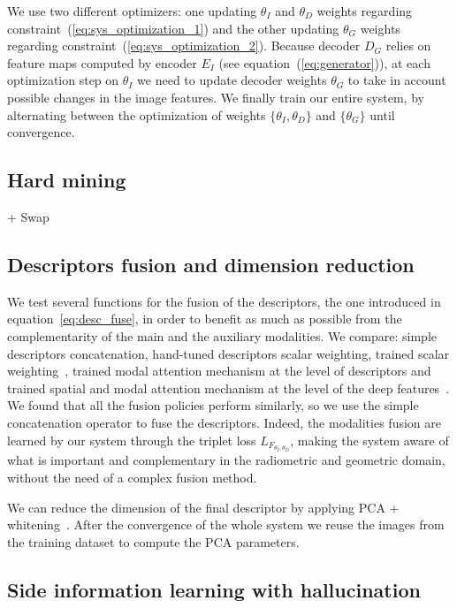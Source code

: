 We use two different optimizers: one updating $\theta_{I}$ and $\theta_{D}$ weights regarding constraint~(\ref{eq:sys_optimization_1}) and the other updating $\theta_{G}$ weights regarding constraint~(\ref{eq:sys_optimization_2}). Because decoder $D_G$ relies on feature maps computed by encoder $E_I$ (see equation~(\ref{eq:generator})), at each optimization step on $\theta_{I}$ we need to update decoder weights $\theta_{G}$ to take in account possible changes in the image features. We finally train our entire system, by alternating between the optimization of weights $\{\theta_{I}, \theta_{D}\}$ and $\{\theta_G\}$ until convergence.

\subsection{Hard mining}

+ Swap

\subsection{Descriptors fusion and dimension reduction}
\label{subsec:fuse_desc}
We test several functions for the fusion of the descriptors, the one introduced in equation~\ref{eq:desc_fuse}, in order to benefit as much as possible from the complementarity of the main and the auxiliary modalities. We compare: simple descriptors concatenation, hand-tuned descriptors scalar weighting, trained scalar weighting~\cite{Sizikova2016}, trained modal attention mechanism at the level of descriptors and trained spatial and modal attention mechanism at the level of the deep features~\cite{Seymour2018}. We found that all the fusion policies perform similarly, so we use the simple concatenation operator to fuse the descriptors. Indeed, the modalities fusion are learned by our system through the triplet loss $L_{F_{\theta_{I}, \theta_{D}}}$, making the system aware of what is important and complementary in the radiometric and geometric domain, without the need of a complex fusion method.

We can reduce the dimension of the final descriptor by applying PCA + whitening~\cite{Arandjelovic2017, Radenovic2016, Radenovic2017, Gordo2017}. After the convergence of the whole system we reuse the images from the training dataset to compute the PCA parameters.

\subsection{Side information learning with hallucination}
\label{subsec:hall}

